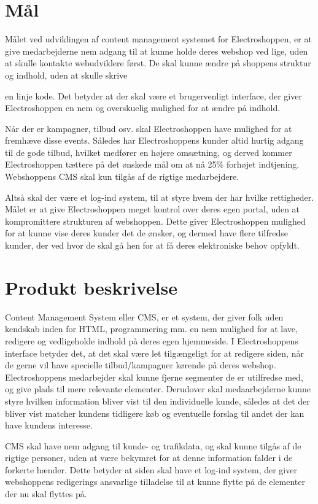 \section{Mål}
Målet ved udviklingen af content management systemet for Electroshoppen, er at give medarbejderne nem adgang til at kunne holde deres webshop ved lige, uden at skulle kontakte webudviklere først. De skal kunne ændre på shoppens struktur og indhold, uden at skulle skrive 

en linje kode. Det betyder at der skal være et brugervenligt interface, der giver Electroshoppen en nem og overskuelig mulighed for at ændre på indhold. 

Når der er kampagner, tilbud osv. skal Electroshoppen have mulighed for at fremhæve disse events. Således har Electroshoppens kunder altid hurtig adgang til de gode tilbud, hvilket medfører en højere omsætning, og derved kommer Electroshoppen tættere på det ønskede mål om at nå 25\% forhøjet indtjening. Webshoppens CMS skal kun tilgås af de rigtige medarbejdere. 

Altså skal der være et log-ind system, til at styre hvem der har hvilke rettigheder. Målet er at give Electroshoppen meget kontrol over deres egen portal, uden at kompromittere strukturen af webshoppen. Dette giver Electroshoppen mulighed for at kunne vise deres kunder det de ønsker, og dermed have flere tilfredse kunder, der ved hvor de skal gå hen for at få deres elektroniske behov opfyldt.

\section{Produkt beskrivelse}
Content Management System eller CMS, er et system, der giver folk uden kendskab inden for HTML, programmering mm. en nem mulighed for at lave, redigere og vedligeholde indhold på deres egen hjemmeside. I Electroshoppens interface betyder det, at det skal være let tilgængeligt for at redigere siden, når de gerne vil have specielle tilbud/kampagner kørende på deres webshop. Electroshoppens medarbejder  skal kunne fjerne segmenter de er utilfredse med, og give plads til mere relevante elementer. Derudover skal medaarbejderne kunne styre hvilken information bliver vist til den individuelle kunde, således at det der bliver vist matcher kundens tidligere køb og eventuelle forslag til andet der kan have kundens interesse.

CMS skal have nem adgang til kunde- og trafikdata, og skal kunne tilgås af de rigtige personer, uden at være bekymret for at denne information falder i de forkerte hænder. Dette betyder at siden skal have et log-ind system, der giver webshoppens redigerings ansvarlige tilladelse til at kunne flytte på de elementer der nu skal flyttes på.

